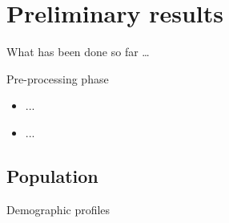 \documentclass[12pt]{beamer}
\begin{document}
\section{Preliminary results}


\begin{frame}
	\centerline{\Huge\textcolor{bscuro}{What has been done so far \ldots}}		
\end{frame}


\begin{frame}{\textcolor{bscuro}{Pre-processing phase}}
	\begin{itemize}
		\item ...
		\item ...
	\end{itemize}
\end{frame}


\subsection{Population}


\begin{frame}{\textcolor{bscuro}{Demographic profiles}}
	\begin{figure}[!ht] 
		\centering
	\end{figure}
\end{frame}
\end{document}
